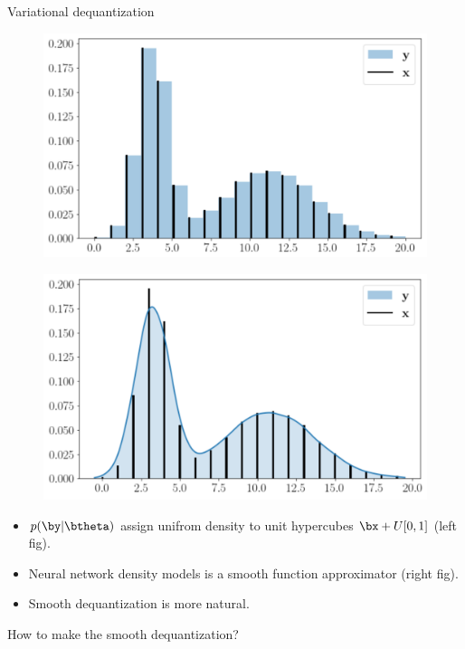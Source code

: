 \begin{frame}{Variational dequantization}
	\begin{minipage}[t]{0.5\columnwidth}
			\begin{figure}
				\centering
				\includegraphics[width=1.0\linewidth]{figs/uniform_dequantization.png}
			\end{figure}
	\end{minipage}%
	\begin{minipage}[t]{0.5\columnwidth}
		\begin{figure}
			\centering
			\includegraphics[width=1.0\linewidth]{figs/variational_dequantization.png}
		\end{figure}
	\end{minipage}
	\begin{itemize}
		\item $p(\by | \btheta)$ assign unifrom density to unit hypercubes $\bx + U[0, 1]$ (left fig).
		\item Neural network density models is a smooth function approximator (right fig).
		\item Smooth dequantization is more natural.
	\end{itemize}
	How to make the smooth dequantization? \\
\end{frame}
